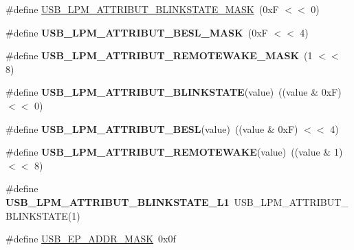 \begin{DoxyCompactItemize}
\item 
\#define \hyperlink{group__usb__protocol__group_gaf39d50c3bb01f68fa434e7fdf3a44e22}{U\-S\-B\-\_\-\-L\-P\-M\-\_\-\-A\-T\-T\-R\-I\-B\-U\-T\-\_\-\-B\-L\-I\-N\-K\-S\-T\-A\-T\-E\-\_\-\-M\-A\-S\-K}~(0x\-F $<$$<$ 0)
\item 
\hypertarget{group__usb__protocol__group_ga375e0dee327157ac3e372f52fd090671}{\#define {\bfseries U\-S\-B\-\_\-\-L\-P\-M\-\_\-\-A\-T\-T\-R\-I\-B\-U\-T\-\_\-\-B\-E\-S\-L\-\_\-\-M\-A\-S\-K}~(0x\-F $<$$<$ 4)}\label{group__usb__protocol__group_ga375e0dee327157ac3e372f52fd090671}

\item 
\hypertarget{group__usb__protocol__group_ga9c1618c348394534d968097c8d76c092}{\#define {\bfseries U\-S\-B\-\_\-\-L\-P\-M\-\_\-\-A\-T\-T\-R\-I\-B\-U\-T\-\_\-\-R\-E\-M\-O\-T\-E\-W\-A\-K\-E\-\_\-\-M\-A\-S\-K}~(1 $<$$<$ 8)}\label{group__usb__protocol__group_ga9c1618c348394534d968097c8d76c092}

\item 
\hypertarget{group__usb__protocol__group_ga1deb3dda1fc39b7425359c72eb548b0d}{\#define {\bfseries U\-S\-B\-\_\-\-L\-P\-M\-\_\-\-A\-T\-T\-R\-I\-B\-U\-T\-\_\-\-B\-L\-I\-N\-K\-S\-T\-A\-T\-E}(value)~((value \& 0x\-F) $<$$<$ 0)}\label{group__usb__protocol__group_ga1deb3dda1fc39b7425359c72eb548b0d}

\item 
\hypertarget{group__usb__protocol__group_gac1e42facbd70697849a0518916b854ad}{\#define {\bfseries U\-S\-B\-\_\-\-L\-P\-M\-\_\-\-A\-T\-T\-R\-I\-B\-U\-T\-\_\-\-B\-E\-S\-L}(value)~((value \& 0x\-F) $<$$<$ 4)}\label{group__usb__protocol__group_gac1e42facbd70697849a0518916b854ad}

\item 
\hypertarget{group__usb__protocol__group_ga7482138e5ce2d2ec9482bcd5dbd9bd64}{\#define {\bfseries U\-S\-B\-\_\-\-L\-P\-M\-\_\-\-A\-T\-T\-R\-I\-B\-U\-T\-\_\-\-R\-E\-M\-O\-T\-E\-W\-A\-K\-E}(value)~((value \& 1) $<$$<$ 8)}\label{group__usb__protocol__group_ga7482138e5ce2d2ec9482bcd5dbd9bd64}

\item 
\hypertarget{group__usb__protocol__group_ga02be6765d15e86d37fd66ce6862a16fc}{\#define {\bfseries U\-S\-B\-\_\-\-L\-P\-M\-\_\-\-A\-T\-T\-R\-I\-B\-U\-T\-\_\-\-B\-L\-I\-N\-K\-S\-T\-A\-T\-E\-\_\-\-L1}~U\-S\-B\-\_\-\-L\-P\-M\-\_\-\-A\-T\-T\-R\-I\-B\-U\-T\-\_\-\-B\-L\-I\-N\-K\-S\-T\-A\-T\-E(1)}\label{group__usb__protocol__group_ga02be6765d15e86d37fd66ce6862a16fc}

\item 
\hypertarget{group__usb__protocol__group_ga0316d8f43a1648b76df257332b26aeb9}{\#define \hyperlink{group__usb__protocol__group_ga0316d8f43a1648b76df257332b26aeb9}{U\-S\-B\-\_\-\-E\-P\-\_\-\-A\-D\-D\-R\-\_\-\-M\-A\-S\-K}~0x0f}\label{group__usb__protocol__group_ga0316d8f43a1648b76df257332b26aeb9}


\end{DoxyCompactItemize}
